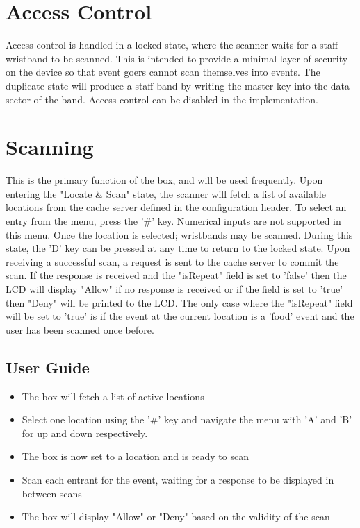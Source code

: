 \documentclass{article}
\begin{document}
\section{Access Control}
Access control is handled in a locked state, where the scanner waits for a staff wristband to be scanned.  This is intended to provide a minimal layer of security on the device so that event goers cannot scan themselves into events.  The duplicate state will produce a staff band by writing the master key into the data sector of the band.  Access control can be disabled in the implementation.

\section{Scanning}
This is the primary function of the box, and will be used frequently.  Upon entering the "Locate \& Scan" state, the scanner will fetch a list of available locations from the cache server defined in the configuration header.  To select an entry from the menu, press the '\#' key. Numerical inputs are not supported in this menu.  Once the location is selected; wristbands may be scanned.  During this state, the 'D' key can be pressed at any time to return to the locked state.  Upon receiving a successful scan, a request is sent to the cache server to commit the scan.  If the response is received and the "isRepeat" field is set to 'false' then the LCD will display "Allow" if no response is received or if the field is set to 'true' then "Deny" will be printed to the LCD.  The only case where the "isRepeat" field will be set to 'true' is if the event at the current location is a 'food' event and the user has been scanned once before.  
\subsection{User Guide}
\begin{itemize}
	\item The box will fetch a list of active locations
	\item Select one location using the '\#' key and navigate the menu with 'A' and 'B' for up and down respectively.
	\item The box is now set to a location and is ready to scan
	\item Scan each entrant for the event, waiting for a response to be displayed in between scans
	\item The box will display "Allow" or "Deny" based on the validity of the scan
\end{itemize}
\end{document}
